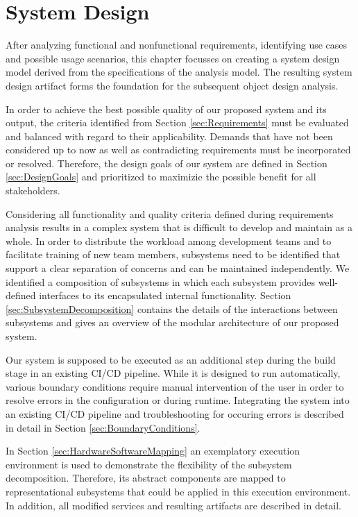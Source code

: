 \chapter{System Design}
\label{ch:SystemDesign}

After analyzing functional and nonfunctional requirements, identifying use cases and possible usage scenarios, this chapter focusses on creating a system design model derived from the specifications of the analysis model. The resulting system design artifact forms the foundation for the subsequent object design analysis.

In order to achieve the best possible quality of our proposed system and its output, the criteria identified from Section \ref{sec:Requirements} must be evaluated and balanced with regard to their applicability. Demands that have not been considered up to now as well as contradicting requirements must be incorporated or resolved. Therefore, the design goals of our system are defined in Section \ref{sec:DesignGoals} and prioritized to maximizie the possible benefit for all stakeholders. 

Considering all functionality and quality criteria defined during requirements analysis results in a complex system that is difficult to develop and maintain as a whole. In order to distribute the workload among development teams and to facilitate training of new team members, subsystems need to be identified that support a clear separation of concerns and can be maintained independently. We identified a composition of subsystems in which each subsystem provides well-defined interfaces to its encapsulated internal functionality. Section \ref{sec:SubsystemDecomposition} contains the details of the interactions between subsystems and gives an overview of the modular architecture of our proposed system.

Our system is supposed to be executed as an additional step during the build stage in an existing CI/CD pipeline. While it is designed to run automatically, various boundary conditions require manual intervention of the user in order to resolve errors in the configuration or during runtime. Integrating the system into an existing CI/CD pipeline and troubleshooting for occuring errors is described in detail in Section \ref{sec:BoundaryConditions}.

In Section \ref{sec:HardwareSoftwareMapping} an exemplatory execution environment is used to demonstrate the flexibility of the subsystem decomposition. Therefore, its abstract components are mapped to representational subsystems that could be applied in this execution environment. In addition, all modified services and resulting artifacts are described in detail.
\newpage

\newpage




